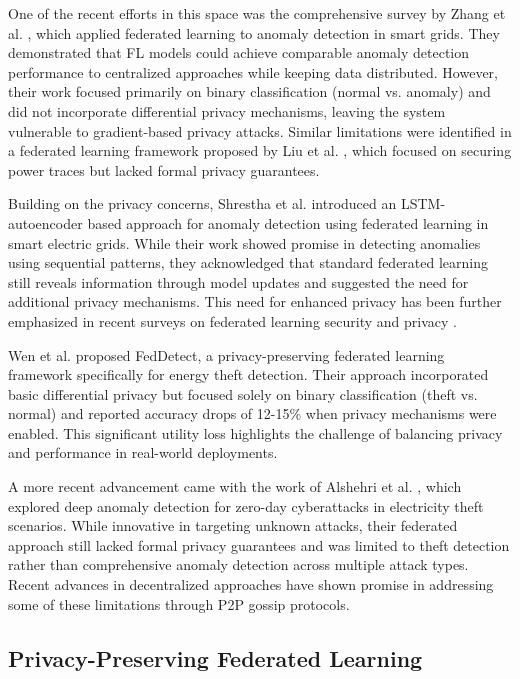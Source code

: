 \documentclass{ieeeaccess}
\theoremstyle{definition}
\begin{document}
One of the recent efforts in this space was the comprehensive survey by Zhang et al. \cite{zhang2024federated}, which applied federated learning to anomaly detection in smart grids. They demonstrated that FL models could achieve comparable anomaly detection performance to centralized approaches while keeping data distributed. However, their work focused primarily on binary classification (normal vs. anomaly) and did not incorporate differential privacy mechanisms, leaving the system vulnerable to gradient-based privacy attacks. Similar limitations were identified in a federated learning framework proposed by Liu et al. \cite{liu2021federated}, which focused on securing power traces but lacked formal privacy guarantees.

Building on the privacy concerns, Shrestha et al. \cite{shrestha2024anomaly} introduced an LSTM-autoencoder based approach for anomaly detection using federated learning in smart electric grids. While their work showed promise in detecting anomalies using sequential patterns, they acknowledged that standard federated learning still reveals information through model updates and suggested the need for additional privacy mechanisms. This need for enhanced privacy has been further emphasized in recent surveys on federated learning security and privacy \cite{cao2024survey}.

Wen et al. \cite{wen2021feddetect} proposed FedDetect, a privacy-preserving federated learning framework specifically for energy theft detection. Their approach incorporated basic differential privacy but focused solely on binary classification (theft vs. normal) and reported accuracy drops of 12-15\% when privacy mechanisms were enabled. This significant utility loss highlights the challenge of balancing privacy and performance in real-world deployments.

A more recent advancement came with the work of Alshehri et al. \cite{alshehri2024deep}, which explored deep anomaly detection for zero-day cyberattacks in electricity theft scenarios. While innovative in targeting unknown attacks, their federated approach still lacked formal privacy guarantees and was limited to theft detection rather than comprehensive anomaly detection across multiple attack types. Recent advances in decentralized approaches \cite{husnoo2024decentralized} have shown promise in addressing some of these limitations through P2P gossip protocols.

\subsection{Privacy-Preserving Federated Learning}
\end{document}
